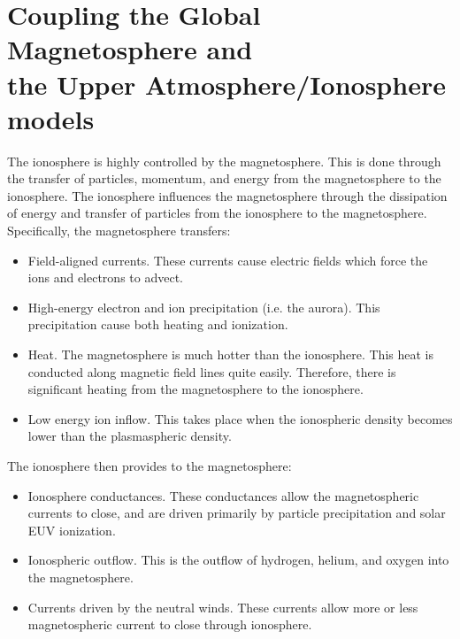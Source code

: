 \section{Coupling the Global Magnetosphere and \\
         the Upper Atmosphere/Ionosphere models}

The ionosphere is highly controlled by the magnetosphere.  This is
done through the transfer of particles, momentum, and energy from the
magnetosphere to the ionosphere.  The ionosphere influences the
magnetosphere through the dissipation of energy and transfer of
particles from the ionosphere to the magnetosphere.  Specifically,
the magnetosphere transfers:

\begin{itemize}

\item
Field-aligned currents.  These currents cause electric fields which 
force the ions and electrons to advect.

\item
High-energy electron and ion precipitation (i.e. the aurora).  This
precipitation cause both heating and ionization.

\item
Heat.  The magnetosphere is much hotter than the ionosphere.  This
heat is conducted along magnetic field lines quite easily.  Therefore,
there is significant heating from the magnetosphere to the ionosphere.

\item
Low energy ion inflow.  This takes place when the ionospheric density
becomes lower than the plasmaspheric density.

\end{itemize}

The ionosphere then provides to the magnetosphere:

\begin{itemize}

\item
Ionosphere conductances.  These conductances allow the magnetospheric
currents to close, and are driven primarily by particle precipitation
and solar EUV ionization.

\item
Ionospheric outflow.  This is the outflow of hydrogen, helium, and
oxygen into the magnetosphere.

\item
Currents driven by the neutral winds.  These currents allow more or
less magnetospheric current to close through ionosphere.

\end{itemize}

